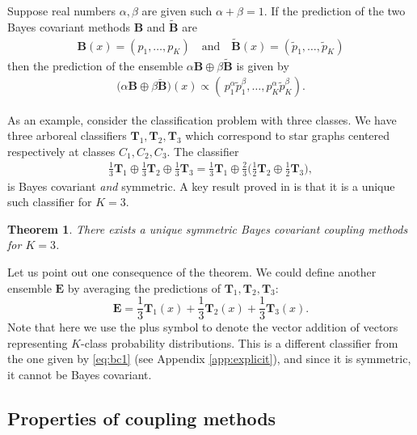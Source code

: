 \documentclass[twoside,11pt]{article}
\newtheorem{thm}{Theorem}
\begin{document}
 Suppose real numbers $\alpha, \beta$ are given such $\alpha + \beta = 1$. If the prediction of the two Bayes covariant methods $\boldsymbol{B}$ and $\boldsymbol{\tilde B}$ are
\begin{align*}
	\boldsymbol{B}(x) = (p_1, \ldots, p_K)\quad\textrm{and}\quad \boldsymbol{\tilde B}(x) = (\tilde p_1, \ldots, \tilde p_K)
\end{align*}
then the prediction of the ensemble $\alpha 	\boldsymbol{B} \oplus \beta \boldsymbol{\tilde B}$ is given by
\begin{align*}
	\bigl(\alpha 	\boldsymbol{B} \oplus \beta \boldsymbol{\tilde B}\bigr)(x)\propto (\,p_1^\alpha \tilde p_1^\beta, \ldots, p_K^\alpha \tilde p_K^\beta).
\end{align*}

As an example, consider the classification problem with three classes. We have three arboreal classifiers $\boldsymbol{T}_1, \boldsymbol{T}_2, \boldsymbol{T}_3$ which correspond to star graphs centered respectively at classes $C_1, C_2, C_3$. The classifier 
\begin{align}
\frac13 \boldsymbol{T}_1 \oplus \frac13 \boldsymbol{T}_2 \oplus \frac 13 \boldsymbol{T}_3 = \frac13 \boldsymbol{T}_1 \oplus \frac23 \biggl(\frac12 \boldsymbol{T}_2 \oplus \frac 12 \boldsymbol{T}_3
\biggr), \label{eq:bc1}
\end{align}
is Bayes covariant \emph{and} symmetric. A key result proved in \cite{vsuch2016bayes} is that it is a unique such classifier for $K=3$.

\begin{thm}
	There exists a unique symmetric Bayes covariant coupling methods for $K=3$.
\end{thm}

Let us point out one consequence of the theorem. We could define another ensemble $\boldsymbol{E}$ by averaging the predictions of $\boldsymbol{T}_1, \boldsymbol{T}_2, \boldsymbol{T}_3$:
\[
\boldsymbol{E} = \frac13 \boldsymbol{T}_1(x) + \frac13 \boldsymbol{T}_2(x) + \frac 13 \boldsymbol{T}_3(x).
\]
Note that here we use the plus symbol to denote the vector addition of vectors representing $K$-class probability distributions. This is a different classifier from the one given by  \eqref{eq:bc1} (see Appendix \ref{app:explicit}), and since it is symmetric, it cannot be Bayes covariant.

\subsection{Properties of coupling methods}
\end{document}
